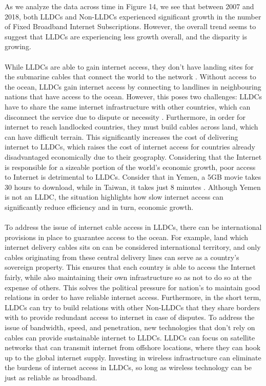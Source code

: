 \documentclass[15pt]{article}
\begin{document}
\noindent As we analyze the data across time in Figure 14, we see that between 2007 and 2018, both LLDCs and Non-LLDCs experienced significant growth in the number of Fixed Broadband Internet Subscriptions. However, the overall trend seems to suggest that LLDCs are experiencing less growth overall, and the disparity is growing. \\
\\
While LLDCs are able to gain internet access, they don't have landing sites for the submarine cables that connect the world to the network \cite{6}. Without access to the ocean, LLDCs gain internet access by connecting to landlines in neighbouring nations that have access to the ocean. However, this poses two challenges: LLDCs have to share the same internet infrastructure with other countries, which can disconnect the service due to dispute or necessity \cite{6}. Furthermore, in order for internet to reach landlocked countries, they must build cables across land, which can have difficult terrain. This significantly increases the cost of delivering internet to LLDCs, which raises the cost of internet access for countries already disadvantaged economically due to their geography. Considering that the Internet is responsible for a sizeable portion of the world's economic growth, poor access to Internet is detrimental to LLDCs. Consider that in Yemen, a 5GB movie takes 30 hours to download, while in Taiwan, it takes just 8 minutes \cite{7}. Although Yemen is not an LLDC, the situation highlights how slow internet access can significantly reduce efficiency and in turn, economic growth.\\
\\
To address the issue of internet cable access in LLDCs, there can be international provisions in place to guarantee access to the ocean. For example, land which internet delivery cables sits on can be considered international territory, and only cables originating from these central delivery lines can serve as a country's sovereign property. This ensures that each country is able to access the Internet fairly, while also maintaining their own infrastructure so as not to do so at the expense of others. This solves the political pressure for nation's to maintain good relations in order to have reliable internet access. Furthermore, in the short term, LLDCs can try to build relations with other Non-LLDCs that they share borders with to provide redundant access to internet in case of disputes. To address the issue of bandwidth, speed, and penetration, new technologies that don't rely on cables can provide sustainable internet to LLDCs. LLDCs can focus on satellite networks that can transmit internet from offshore locations, where they can hook up to the global internet supply. Investing in wireless infrastructure can eliminate the burdens of internet access in LLDCs, so long as wireless technology can be just as reliable as broadband.
\end{document}
